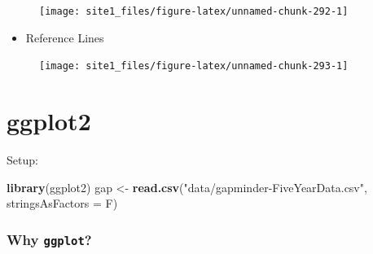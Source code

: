 \documentclass[]{book}
\newenvironment{Shaded}{\begin{snugshade}}{\end{snugshade}}
\newcommand{\KeywordTok}[1]{\textcolor[rgb]{0.13,0.29,0.53}{\textbf{#1}}}
\newcommand{\DataTypeTok}[1]{\textcolor[rgb]{0.13,0.29,0.53}{#1}}
\newcommand{\DecValTok}[1]{\textcolor[rgb]{0.00,0.00,0.81}{#1}}
\newcommand{\StringTok}[1]{\textcolor[rgb]{0.31,0.60,0.02}{#1}}
\newcommand{\CommentTok}[1]{\textcolor[rgb]{0.56,0.35,0.01}{\textit{#1}}}
\newcommand{\OperatorTok}[1]{\textcolor[rgb]{0.81,0.36,0.00}{\textbf{#1}}}
\newcommand{\NormalTok}[1]{#1}
\providecommand{\tightlist}{%
  \setlength{\itemsep}{0pt}\setlength{\parskip}{0pt}}
\begin{document}
\begin{figure}

{\centering \texttt{[image: site1\_files/figure-latex/unnamed-chunk-292-1]} 

}

\caption{ }\label{fig:unnamed-chunk-292}
\end{figure}

\begin{itemize}
\tightlist
\item
  Reference Lines
\end{itemize}

\begin{Shaded}
\end{Shaded}

\begin{figure}

{\centering \texttt{[image: site1\_files/figure-latex/unnamed-chunk-293-1]} 

}

\caption{ }\label{fig:unnamed-chunk-293}
\end{figure}

\section{ggplot2}\label{ggplot2}

Setup:

\begin{Shaded}
\begin{Highlighting}[]
\KeywordTok{library}\NormalTok{(ggplot2)}
\NormalTok{gap <-}\StringTok{ }\KeywordTok{read.csv}\NormalTok{(}\StringTok{"data/gapminder-FiveYearData.csv"}\NormalTok{, }\DataTypeTok{stringsAsFactors =}\NormalTok{ F)}
\end{Highlighting}
\end{Shaded}

\subsubsection*{\texorpdfstring{Why
\texttt{ggplot}?}{Why ggplot?}}\label{why-ggplot}
\end{document}
